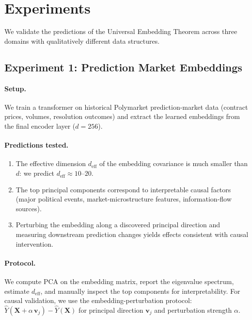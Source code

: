 \documentclass[11pt,a4paper]{article}
\theoremstyle{plain}
\theoremstyle{definition}
\theoremstyle{remark}
\newcommand{\deff}{d_{\mathrm{eff}}}
\begin{document}
\section{Experiments}\label{sec:experiments}

We validate the predictions of the Universal Embedding Theorem across three
domains with qualitatively different data structures.

\subsection{Experiment 1: Prediction Market Embeddings}\label{sec:exp-polymarket}

\paragraph{Setup.}
We train a transformer on historical Polymarket prediction-market data (contract
prices, volumes, resolution outcomes) and extract the learned embeddings from the
final encoder layer ($d = 256$).

\paragraph{Predictions tested.}
\begin{enumerate}[leftmargin=2em,itemsep=2pt]
  \item The effective dimension $\deff$ of the embedding covariance is much
    smaller than $d$: we predict $\deff \approx 10$--$20$.
  \item The top principal components correspond to interpretable causal factors
    (major political events, market-microstructure features, information-flow
    sources).
  \item Perturbing the embedding along a discovered principal direction and
    measuring downstream prediction changes yields effects consistent with
    causal intervention.
\end{enumerate}

\paragraph{Protocol.}
We compute PCA on the embedding matrix, report the eigenvalue spectrum, estimate
$\deff$, and manually inspect the top components for interpretability.  For causal
validation, we use the embedding-perturbation protocol:
$\hat{Y}(\mathbf{X} + \alpha\,\mathbf{v}_j) - \hat{Y}(\mathbf{X})$ for
principal direction $\mathbf{v}_j$ and perturbation strength $\alpha$.
\end{document}
